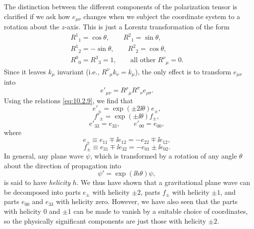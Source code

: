 The distinction between the different components of the polarization tensor
is clarified if we ask how \(e_{\mu\nu}\) changes when we subject the
coordinate system to a rotation about the \(z\)-axis. This is just a Lorentz
transformation of the form
\begin{equation}
  \begin{gathered}
  R^1{}_1=\cos\theta,\qquad R^2{}_1=\sin\theta,\\
  R^1{}_2=-\sin\theta,\qquad R^2{}_2=\cos\theta,\\
  R^0{}_0=R^3{}_3=1,\qquad\text{all other }R^\nu{}_\mu=0.
  \end{gathered}
  \tag{10.2.10}\label{eq:10.2.10}
\end{equation}
Since it leaves \(k_\mu\) invariant (i.e.,
\(R^\nu{}_\mu k_\nu=k_\mu\)), the only effect is to transform
\(e_{\mu\nu}\) into
\begin{equation}
  e'_{\mu\nu}
  =
  R^\rho{}_\mu R^\sigma{}_\nu e_{\rho\sigma}.
  \tag{10.2.11}\label{eq:10.2.11}
\end{equation}
Using the relations \eqref{eq:10.2.9}, we find that
\begin{equation}
  e'_\pm=\exp(\pm2\ii\theta)e_\pm,
  \tag{10.2.12}\label{eq:10.2.12}
\end{equation}
\begin{equation}
  f'_\pm=\exp(\pm\ii\theta)f_\pm,
  \tag{10.2.13}\label{eq:10.2.13}
\end{equation}
\begin{equation}
  e'_{33}=e_{33},
  \qquad
  e'_{00}=e_{00},
  \tag{10.2.14}\label{eq:10.2.14}
\end{equation}
where
\begin{equation}
  e_\pm
  \equiv e_{11}\mp\ii e_{12}
  =-e_{22}\mp\ii e_{12},
  \tag{10.2.15}\label{eq:10.2.15}
\end{equation}
\begin{equation}
  f_\pm
  \equiv e_{31}\mp\ii e_{32}
  =-e_{01}\pm\ii e_{02}.
  \tag{10.2.16}\label{eq:10.2.16}
\end{equation}
In general, any plane wave \(\psi\), which is transformed by a rotation of
any angle \(\theta\) about the direction of propagation into
\begin{equation}
  \psi'=\exp(\ii h\theta)\psi,
  \tag{10.2.17}\label{eq:10.2.17}
\end{equation}
is said to have \emph{helicity} \(h\). We thus have shown that a
gravitational plane wave can be decomposed into parts \(e_\pm\) with helicity
\(\pm2\), parts \(f_\pm\) with helicity \(\pm1\), and parts \(e_{00}\) and
\(e_{33}\) with helicity zero. However, we have also seen that the parts with
helicity \(0\) and \(\pm1\) can be made to vanish by a suitable choice of
coordinates, so the physically significant components are just those with
helicity \(\pm2\).

